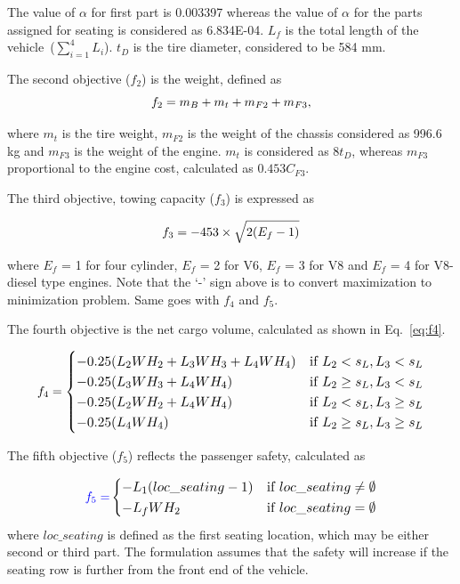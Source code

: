 \documentclass[twocolumn,10pt]{asme2ej}
\begin{document}
The value of $\alpha$ for first part is 0.003397 whereas the value of $\alpha$ for the parts assigned for seating is considered as 6.834E-04. $L_f$ is the total length of the vehicle~($\sum_{i = 1}^4 L_i$). $t_D$ is the tire diameter, considered to be 584 mm. 

The second objective ($f_2$) is the weight, defined as
\begin{equation}\footnotesize
f_2 = m_B + m_t + m_{F2} + m_{F3},
\label{eq:f2}
\end{equation}

\noindent where $m_t$ is the tire weight, $m_{F2}$ is the weight of the chassis considered as 996.6 kg and $m_{F3}$ is the weight of the engine. $m_t$ is considered as $8 t_D$, whereas $m_{F3}$ proportional to the engine cost, calculated as $0.453C_{F3}$.

The third objective, towing capacity ($f_3$) is expressed as

\begin{equation}\footnotesize
f_3 = -453 \times \sqrt{2(E_f-1)} 
\label{eq:f3}
\end{equation}

\noindent where $E_f$ = 1 for four cylinder, $E_f$ = 2 for V6, $E_f$ = 3 for V8 and $E_f$ = 4 for V8-diesel type engines. Note that the `-' sign above is to convert maximization to minimization problem. Same goes with $f_4$ and $f_5$. 

The fourth objective is the net cargo volume, calculated as shown in Eq.~\ref{eq:f4}. 

\begin{equation}\footnotesize
f_4=\begin{cases}
-0.25(L_2WH_2 + L_3WH_3 + L_4WH_4) & \text{if}~L_2 < s_L, L_3 < s_L\\
-0.25(L_3WH_3 + L_4WH_4) & \text{if}~L_2 \ge s_L, L_3 < s_L\\
-0.25(L_2WH_2 + L_4WH_4) & \text{if}~L_2 < s_L, L_3 \ge s_L\\
-0.25(L_4WH_4) & \text{if}~L_2 \ge s_L, L_3 \ge s_L\\
\end{cases}
\label{eq:f4}
\end{equation}

The fifth objective ($f_5$) reflects the passenger safety, calculated as

\begin{equation}\footnotesize
{\color{blue}f_5=}\begin{cases}
-L_1(loc\_seating - 1) & \text{if}~loc\_seating \neq \emptyset\\
-L_fWH_2 & \text{if}~loc\_seating = \emptyset\\
\end{cases}
\label{eq:f5}
\end{equation}
where $loc\_seating$ is defined as the first seating location, which may be either second or third part. The formulation assumes that the safety will increase if the seating row is further from the front end of the vehicle. 
\end{document}
